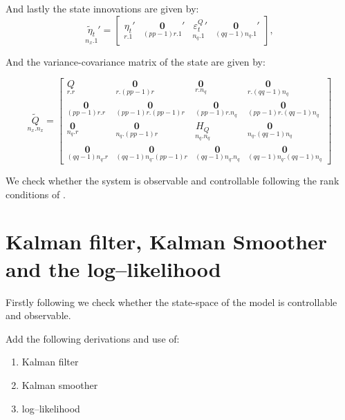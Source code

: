 \documentclass[12pt]{article}
\begin{document}
\begin{appendices}
And lastly the state innovations are given by:
\begin{equation*}
\underset{n_{x}.1}{\tilde{\eta}_{t}}' = 
\begin{bmatrix}
\underset{r.1}{\eta_{t}}' & 
\underset{(pp - 1)r.1}{\textbf{0}}' & 
\underset{n_{q}.1}{\varepsilon_{t}^{Q}}' & 
\underset{(qq -1) n_{q}.1}{\textbf{0}}'
\end{bmatrix},
\end{equation*}

And the variance-covariance matrix of the state are given by:

\begin{equation*}
\underset{n_{x}.n_{x}}{ \widetilde{Q} } =
\begin{bmatrix}
\underset{r.r}{Q} 
& \underset{r.(pp-1)r}{\textbf{0}}
& \underset{r.n_{q}}{\textbf{0}}
& \underset{r.(qq-1)n_{q}}{\textbf{0}}\\
\underset{(pp-1)r.r}{\textbf{0}}
& \underset{(pp-1)r.(pp-1)r}{\textbf{0}}
& \underset{(pp-1)r.n_{q}}{\textbf{0}}
& \underset{(pp-1)r.(qq-1)n_{q}}{\textbf{0}}  \\
\underset{n_{q}.r}{\textbf{0}} 
& \underset{n_{q}.(pp-1)r}{\textbf{0}}
& \underset{n_{q}.n_{q}}{ H_{Q} }
& \underset{n_{q}.(qq-1)n_{q}}{\textbf{0}} \\
\underset{(qq-1)n_{q}.r}{\textbf{0}}	
& \underset{(qq-1)n_{q}.(pp-1)r}{\textbf{0}}
& \underset{(qq-1)n_{q}.n_{q}}{\textbf{0}}
& \underset{(qq-1)n_{q}.(qq-1)n_{q}}{\textbf{0}}
\end{bmatrix}
\end{equation*}

We check whether the system is observable and controllable following the rank conditions of \citet[pp.113--117]{Harvey1989}.



\section{Kalman filter, Kalman Smoother and the log--likelihood}

Firstly following \cite{Harvey1989} we check whether the state-space of the model is controllable and observable. 

Add the following derivations and use of:
\begin{enumerate}
	\item 	Kalman filter
	\item 	Kalman smoother
	\item 	log--likelihood
\end{enumerate}



\end{appendices}
\end{document}

